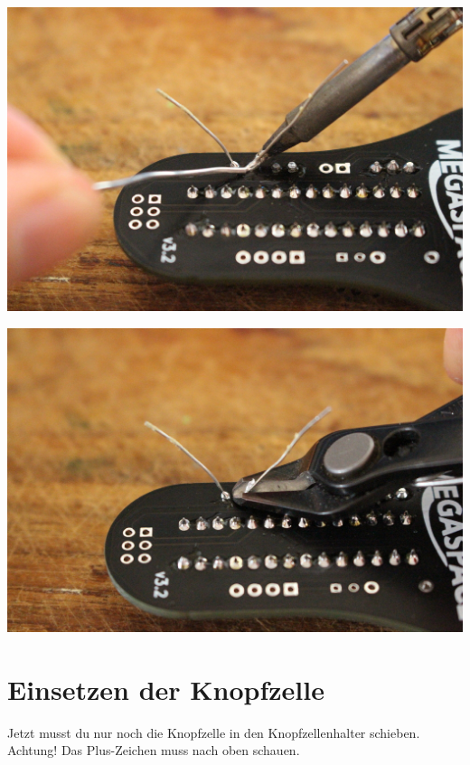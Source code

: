 \documentclass{article}
\begin{document}
\vspace{0.5cm}

\begin{minipage}[b]{0.5\textwidth}
	\includegraphics[width=\textwidth]{Bilder2022/IMG_8237.JPG}
\end{minipage}
\begin{minipage}[b]{0.5\textwidth}
	\includegraphics[width=\textwidth]{Bilder2022/IMG_8238.JPG}
\end{minipage}

\section{Einsetzen der Knopfzelle}

Jetzt musst du nur noch die Knopfzelle in den Knopfzellenhalter schieben.
Achtung! Das Plus-Zeichen muss nach oben schauen.
\end{document}
